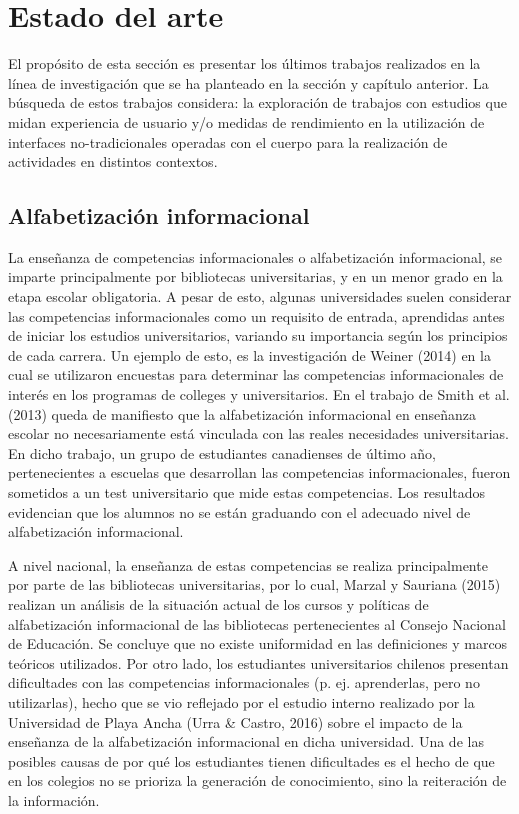 \section{Estado del arte}
\label{sec:estado_arte}
El propósito de esta sección es presentar los últimos trabajos realizados en la línea de investigación que se ha planteado en la sección y capítulo anterior. La búsqueda de estos trabajos considera: la exploración de trabajos con estudios que midan experiencia de usuario y/o medidas de rendimiento en la utilización de interfaces no-tradicionales operadas con el cuerpo para la realización de actividades en distintos contextos.

\subsection{Alfabetización informacional}
La enseñanza de competencias informacionales o alfabetización informacional, se imparte  principalmente por bibliotecas universitarias, y en un menor grado en la etapa escolar obligatoria. A pesar de esto, algunas universidades suelen considerar las competencias informacionales como un requisito de entrada, aprendidas antes de iniciar los estudios universitarios, variando su importancia según los principios de cada carrera. Un ejemplo de esto, es la investigación de Weiner (2014) en la cual se utilizaron encuestas para determinar las competencias informacionales de interés en los programas de colleges y universitarios. En el trabajo de Smith  et al. (2013) queda de manifiesto que la alfabetización informacional en enseñanza escolar no necesariamente está vinculada con las reales necesidades universitarias. En dicho trabajo, un grupo de estudiantes canadienses de último año, pertenecientes a escuelas que desarrollan las competencias informacionales, fueron sometidos a un test universitario que mide estas competencias. Los resultados evidencian que los alumnos no se están graduando con el adecuado nivel de alfabetización informacional.  

A nivel nacional, la enseñanza de estas competencias se realiza principalmente por parte de las bibliotecas universitarias, por lo cual, Marzal y Sauriana (2015) realizan un análisis de la situación actual de los cursos y políticas de alfabetización informacional de las bibliotecas pertenecientes  al Consejo Nacional de Educación. Se concluye que no existe uniformidad en las definiciones y marcos teóricos utilizados. Por otro lado, los estudiantes universitarios chilenos presentan dificultades con las competencias informacionales (p. ej. aprenderlas, pero no utilizarlas), hecho que se vio reflejado por el estudio interno realizado por la Universidad de Playa Ancha (Urra & Castro, 2016) sobre el impacto de la enseñanza de la alfabetización informacional en dicha universidad. Una de las posibles causas de por qué los estudiantes tienen dificultades es el hecho de que en los colegios no se prioriza la generación de conocimiento, sino la reiteración de la información.   

